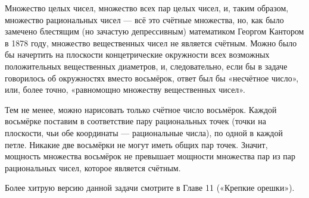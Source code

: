 Множество целых чисел, множество всех пар целых чисел, и, таким образом, множество рациональных чисел --- всё это счётные множества, но, как было замечено блестящим (но зачастую депрессивным) математиком Георгом Кантором в 1878 году, множество вещественных чисел не является счётным.
Можно было бы начертить на плоскости концетрические окружности всех возможных положительных вещественных диаметров, и, следовательно, если бы в задаче говорилось об окружностях вместо восьмёрок, ответ был бы «несчётное число», или, более точно, «равномощно множеству вещественных чисел».%

Тем не менее, можно нарисовать только счётное число восьмёрок.
Каждой восьмёрке поставим в соответствие пару рациональных точек (точки на плоскости, чьи обе координаты --- рациональные числа), по одной в каждой петле.
Никакие две восьмёрки не могут иметь общих пар точек.
Значит, мощность множества восьмёрок не превышает мощности множества пар из пар рациональных чисел, которое является счётным.\heart

Более хитрую версию данной задачи смотрите в Главе 11 («Крепкие орешки»).
